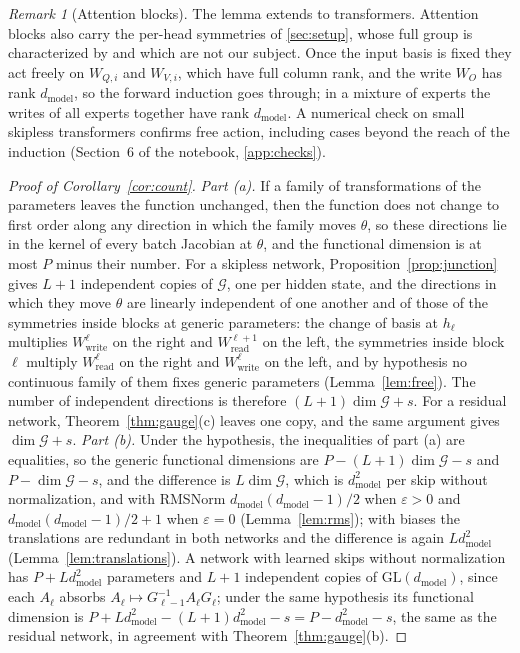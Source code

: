 \documentclass[10pt]{article}
\theoremstyle{definition}
\theoremstyle{remark}
\newtheorem{remark}[theorem]{Remark}
\newcommand{\Wread}{W_{\mathrm{read}}}
\newcommand{\Wwrite}{W_{\mathrm{write}}}
\newcommand{\dm}{d_{\mathrm{model}}}
\newcommand{\GL}{\mathrm{GL}}
\newcommand{\G}{\mathcal{G}}
\begin{document}
\begin{remark}[Attention blocks]\label{rem:attnfree}
The lemma extends to transformers. Attention blocks also carry the per-head symmetries of \cref{sec:setup}, whose full group is characterized by \citet{wang2025gauge} and which are not our subject. Once the input basis is fixed they act freely on $W_{Q,i}$ and $W_{V,i}$, which have full column rank, and the write $W_O$ has rank $\dm$, so the forward induction goes through; in a mixture of experts the writes of all experts together have rank $\dm$. A numerical check on small skipless transformers confirms free action, including cases beyond the reach of the induction (Section~6 of the notebook, \cref{app:checks}).
\end{remark}

\begin{proof}[Proof of Corollary~\ref{cor:count}]
\emph{Part (a).} If a family of transformations of the parameters leaves the function unchanged, then the function does not change to first order along any direction in which the family moves $\theta$, so these directions lie in the kernel of every batch Jacobian at $\theta$, and the functional dimension is at most $P$ minus their number. For a skipless network, Proposition~\ref{prop:junction} gives $L+1$ independent copies of $\G$, one per hidden state, and the directions in which they move $\theta$ are linearly independent of one another and of those of the symmetries inside blocks at generic parameters: the change of basis at $h_{\ell}$ multiplies $\Wwrite^{\ell}$ on the right and $\Wread^{\ell+1}$ on the left, the symmetries inside block $\ell$ multiply $\Wread^{\ell}$ on the right and $\Wwrite^{\ell}$ on the left, and by hypothesis no continuous family of them fixes generic parameters (Lemma~\ref{lem:free}). The number of independent directions is therefore $(L+1)\dim\G + s$. For a residual network, Theorem~\ref{thm:gauge}(c) leaves one copy, and the same argument gives $\dim\G + s$.
\emph{Part (b).} Under the hypothesis, the inequalities of part (a) are equalities, so the generic functional dimensions are $P - (L+1)\dim\G - s$ and $P - \dim\G - s$, and the difference is $L\dim\G$, which is $\dm^2$ per skip without normalization, and with RMSNorm $\dm(\dm-1)/2$ when $\varepsilon > 0$ and $\dm(\dm-1)/2 + 1$ when $\varepsilon = 0$ (Lemma~\ref{lem:rms}); with biases the translations are redundant in both networks and the difference is again $L\dm^2$ (Lemma~\ref{lem:translations}). A network with learned skips without normalization has $P + L\dm^2$ parameters and $L+1$ independent copies of $\GL(\dm)$, since each $A_\ell$ absorbs $A_\ell \mapsto G_{\ell-1}^{-1}A_\ell G_\ell$; under the same hypothesis its functional dimension is $P + L\dm^2 - (L+1)\dm^2 - s = P - \dm^2 - s$, the same as the residual network, in agreement with Theorem~\ref{thm:gauge}(b).
\end{proof}
\end{document}
